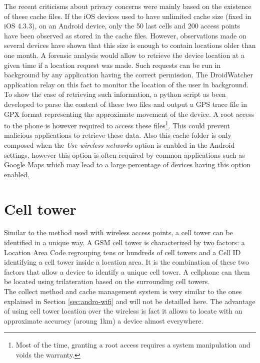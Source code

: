 The recent criticisms about privacy concerns were mainly based on the existence of these cache files.
If the iOS devices used to have unlimited cache size (fixed in iOS 4.3.3), on an Android device, only the 50 last cells and 200 access points have been observed as stored in the cache files.
However, observations made on several devices have shown that this size is enough to contain locations older than one month.
A forensic analysis would allow to retrieve the device location at a given time if a location request was made.
Such requests can be run in background by any application having the correct permission.
The DroidWatcher application relay on this fact to monitor the location of the user in background.\\

To show the ease of retrieving such information, a python script as been developed\cite{soft-locdump} to parse the content of these two files and output a GPS trace file in GPX format representing the approximate movement of the device.
A root access to the phone is however required to access these files\footnote{Most of the time, granting a root access requires a system manipulation and voids the warranty.}.
This could prevent malicious applications to retrieve these data.
Also this cache folder is only composed when the \emph{Use wireless networks} option is enabled in the Android settings, however this option is often required by common applications such as Google Maps which may lead to a large percentage of devices having this option enabled.\\

\section{Cell tower}
Similar to the method used with wireless access points, a cell tower can be identified in a unique way.
A GSM cell tower is characterized by two factors: a Location Area Code regrouping tens or hundreds of cell towers and a Cell ID identifying a cell tower inside a location area.
It is the combination of these two factors that allow a device to identify a unique cell tower.
A cellphone can them be located using trilateration based on the surrounding cell towers.\\

The collect method and cache management system is very similar to the ones explained in Section \ref{sec:andro-wifi} and will not be detailled here.
The advantage of using cell tower location over the wireless is fact it allows to locate with an approximate accuracy (aroung 1km) a device almost everywhere.


